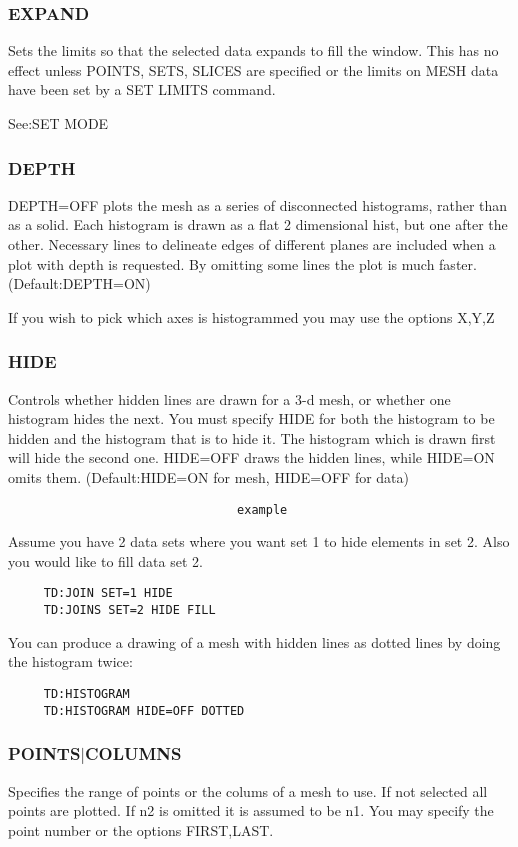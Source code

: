 \subsubsection{EXPAND}
Sets  the  limits so that the selected data expands to fill the window.
This has no effect unless POINTS, SETS, SLICES  are  specified  or  the
limits on MESH data have been set by a SET LIMITS command.  

See:SET MODE 
\subsubsection{DEPTH}
DEPTH=OFF plots the mesh as a series of disconnected histograms, rather
than as a solid.  Each histogram is drawn as a flat 2 dimensional hist,
but  one  after  the  other.   Necessary  lines  to  delineate edges of
different planes are included when a plot with depth is requested.   By
omitting some lines the plot is much faster.  
(Default:DEPTH=ON) 

If  you wish to pick which axes is histogrammed you may use the options
X,Y,Z 
\subsubsection{HIDE}
Controls  whether hidden lines are drawn for a 3-d mesh, or whether one
histogram hides the next.  You must specify HIDE for both the histogram
to be hidden and the histogram that is to hide it.  The histogram which
is drawn first will hide the second one.   HIDE=OFF  draws  the  hidden
lines, while HIDE=ON omits them.  
(Default:HIDE=ON for mesh, HIDE=OFF for data) 

\begin{verbatim}
                                example
\end{verbatim}
Assume  you  have  2 data sets where you want set 1 to hide elements in
set 2.  Also you would like to fill data set 2.  
\begin{verbatim}
     TD:JOIN SET=1 HIDE 
     TD:JOINS SET=2 HIDE FILL 
\end{verbatim}

You  can  produce a drawing of a mesh with hidden lines as dotted lines
by doing the histogram twice:  
\begin{verbatim}
     TD:HISTOGRAM 
     TD:HISTOGRAM HIDE=OFF DOTTED 
\end{verbatim}
\subsubsection{POINTS$|$COLUMNS}
Specifies  the  range of points or the colums of a mesh to use.  If not
selected all points are plotted.  If n2 is omitted it is assumed to  be
n1.  You may specify the point number or the options FIRST,LAST.  
